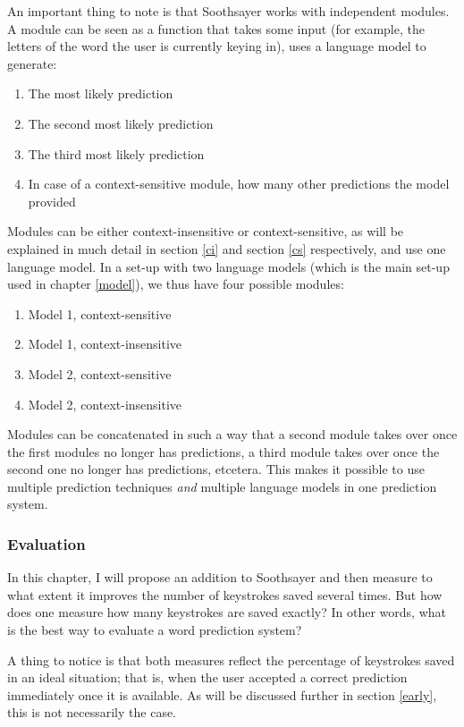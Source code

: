 \documentclass[12pt]{article}
\begin{document}
An important thing to note is that Soothsayer works with independent modules. A module can be seen as a function that takes some input (for example, the letters of the word the user is currently keying in), uses a language model to generate:

\begin{enumerate}
\item The most likely prediction
\item The second most likely prediction
\item The third most likely prediction
\item In case of a context-sensitive module, how many other predictions the model provided
\end{enumerate}

Modules can be either context-insensitive or context-sensitive, as will be explained in much detail in section \ref{ci} and section \ref{cs} respectively, and use one language model. In a set-up with two language models (which is the main set-up used in chapter \ref{model}), we thus have four possible modules:

\begin{enumerate}
\item Model 1, context-sensitive
\item Model 1, context-insensitive
\item Model 2, context-sensitive
\item Model 2, context-insensitive
\end{enumerate}

Modules can be concatenated in such a way that a second module takes over once the first modules no longer has predictions, a third module takes over once the second one no longer has predictions, etcetera. This makes it possible to use multiple prediction techniques \emph{and} multiple language models in one prediction system.

\subsubsection{Evaluation}
In this chapter, I will propose an addition to Soothsayer and then measure to what extent it improves the number of keystrokes saved several times. But how does one measure how many keystrokes are saved exactly? In other words, what is the best way to evaluate a word prediction system?



A thing to notice is that both measures reflect the percentage of keystrokes saved in an ideal situation; that is, when the user accepted a correct prediction immediately once it is available. As will be discussed further in section \ref{early}, this is not necessarily the case. 
\end{document}
